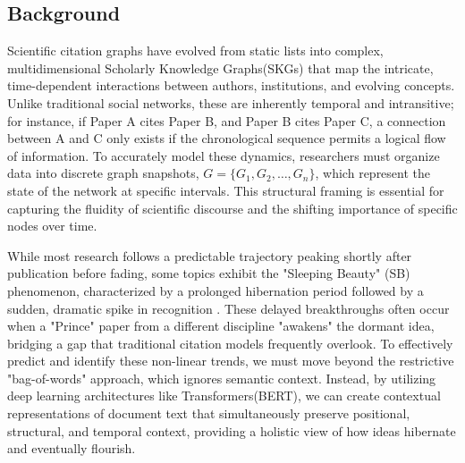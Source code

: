 \documentclass[a4paper,12pt]{article}
\begin{document}
\subsection{Background}
Scientific citation graphs have evolved from static lists into complex, multidimensional 
Scholarly Knowledge Graphs(SKGs) that map the intricate, time-dependent interactions between 
authors, institutions, and evolving concepts. Unlike traditional social networks, these are 
inherently temporal and intransitive; for instance, if Paper A cites Paper B, and Paper B 
cites Paper C, a connection between A and C only exists if the chronological sequence 
permits a logical flow of information\parencite{holme_temporal_2012}. To accurately model 
these dynamics, researchers must organize data into discrete graph snapshots, 
$G = \{G_1, G_2, \dots, G_n\}$, which represent the state of the network at specific intervals. 
This structural framing is essential for capturing the fluidity of scientific discourse and 
the shifting importance of specific nodes over time.

While most research follows a predictable trajectory peaking shortly after publication 
before fading, some topics exhibit the "Sleeping Beauty" (SB) phenomenon, characterized by 
a prolonged hibernation period followed by a sudden, dramatic spike in recognition
\parencites{van_raan_sleeping_2004}{ke_defining_2015}. These delayed breakthroughs 
often occur when a "Prince" paper from a different discipline "awakens" the dormant idea, 
bridging a gap that traditional citation models frequently overlook. To effectively predict 
and identify these non-linear trends, we must move beyond the restrictive "bag-of-words" 
approach, which ignores semantic context. Instead, by utilizing deep learning architectures 
like Transformers(BERT), we can create contextual representations of document text that 
simultaneously preserve positional, structural, and temporal context\parencite{devlin_bert_2019}, 
providing a holistic view of how ideas hibernate and eventually flourish.
\end{document}
